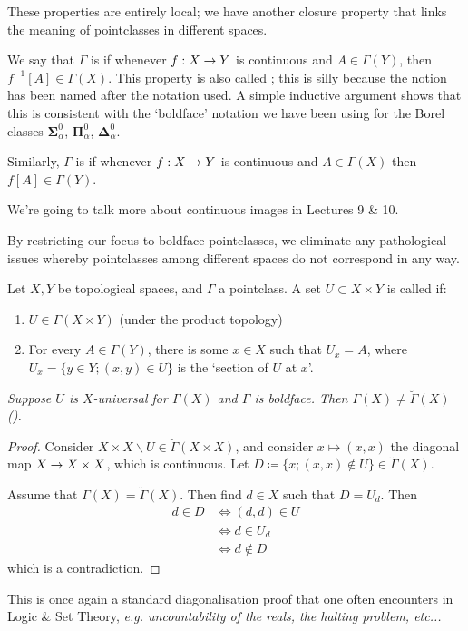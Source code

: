 \documentclass[]{article}
\newcommand{\bosig}{\bm{\Sigma}}
\newcommand{\bopi}{\bm{\Pi}}
\newcommand{\bodel}{\bm{\Delta}}
\newcommand{\bg}{{\breve \Gamma}}
\begin{document}
These properties are entirely local; we have another closure property that links the meaning of pointclasses in different spaces.

We say that $\Gamma$ is  if whenever $f : X \rightarrow Y$ is continuous and $A \in \Gamma(Y)$, then $f^{-1}[A] \in \Gamma(X)$. This property is also called ; this is silly because the notion has been named after the notation used. A simple inductive argument shows that this is consistent with the `boldface' notation we have been using for the Borel classes $\bosig_\alpha^0$, $\bopi_\alpha^0$, $\bodel_\alpha^0$.

Similarly, $\Gamma$ is  if whenever $f : X \rightarrow Y$ is continuous and $A \in \Gamma(X)$ then $f[A] \in \Gamma(Y)$.

We're going to talk more about continuous images in Lectures 9 \& 10.

By restricting our focus to boldface pointclasses, we eliminate any pathological issues whereby pointclasses among different spaces do not correspond in any way.

\begin{defin*}[]
    Let $X,Y$ be topological spaces, and $\Gamma$ a pointclass. A set $U \subset X \times Y$ is called  if:
    \begin{enumerate}
        \item $U \in \Gamma(X\times Y)$ (under the product topology)
        \item For every $A \in \Gamma(Y)$, there is some $x \in X$ such that $U_x = A$, where $U_x = \{y \in Y ; (x,y)\in U\}$ is the `section of $U$ at $x$'.
    \end{enumerate}
\end{defin*}

\begin{remark*}[Lemma]
    \emph
    {
        Suppose $U$ is $X$-universal for $\Gamma(X)$ and $\Gamma$ is boldface. Then $\Gamma(X) \ne \bg(X)$ ().
    }
\end{remark*}
\begin{proof}
    Consider $X\times X\backslash U \in \bg(X\times X)$, and consider $x\mapsto (x,x)$ the diagonal map $X \rightarrow X \times X$, which is continuous. Let $D\coloneqq \{x;(x,x)\not\in U\} \in \bg(X)$.

    Assume that $\Gamma(X) = \bg(X)$. Then find $d \in X$ such that $D = U_d$. Then
    \begin{align*}
        d \in D &\iff (d,d) \in U\\
        &\iff d \in U_d\\
        &\iff d\not\in D
    \end{align*}
    which is a contradiction.
\end{proof}
This is once again a standard diagonalisation proof that one often encounters in Logic \& Set Theory, \it{e.g.} uncountability of the reals, the halting problem, \it{etc}...
\end{document}
